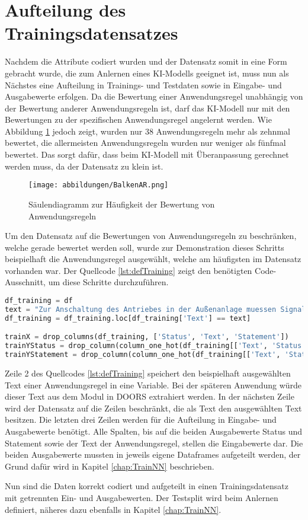 \section{Aufteilung des Trainingsdatensatzes}
\label{chap:Trainingssplit}
Nachdem die Attribute codiert wurden und der Datensatz somit in eine Form gebracht wurde, die zum Anlernen eines \ac{KI}-Modells geeignet ist, 
muss nun als Nächstes eine Aufteilung in Trainings- und Testdaten sowie in Eingabe- und Ausgabewerte erfolgen. Da die Bewertung einer Anwendungsregel
unabhängig von der Bewertung anderer Anwendungsregeln ist, darf das \ac{KI}-Modell nur mit den Bewertungen zu der spezifischen Anwendungsregel angelernt werden.
Wie Abbildung \ref*{fig:ARMenge} jedoch zeigt, wurden nur 38 Anwendungsregeln mehr als zehnmal bewertet, die allermeisten Anwendungsregeln wurden nur weniger als 
fünfmal bewertet. Das sorgt dafür, dass beim \ac{KI}-Modell mit Überanpassung gerechnet werden muss, da der Datensatz zu klein ist.
\begin{figure}[H]
    \centering
    \texttt{[image: abbildungen/BalkenAR.png]}
    \caption{Säulendiagramm zur Häufigkeit der Bewertung von Anwendungsregeln}
    \label{fig:ARMenge}
\end{figure}

Um den Datensatz auf die Bewertungen von Anwendungsregeln zu beschränken, welche gerade bewertet werden soll, wurde zur Demonstration dieses Schritts 
beispielhaft die Anwendungsregel ausgewählt, welche am häufigsten im Datensatz vorhanden war. Der Quellcode \ref*{lst:defTraining} zeigt den benötigten Code-Ausschnitt,
um diese Schritte durchzuführen.

\begin{lstlisting}[language = python, caption={Definieren des Trainingsdatensatzes},captionpos=b, label = lst:defTraining, floatplacement=H]
df_training = df
text = "Zur Anschaltung des Antriebes in der Außenanlage muessen Signalkabel nach VDE 0816/2 oder Kabel mit vergleichbaren Eigenschaften verwendet werden. Die Verlegevorschriften des Kabels sind einzuhalten."
df_training = df_training.loc[df_training['Text'] == text]

trainX = drop_columns(df_training, ['Status', 'Text', 'Statement'])
trainYStatus = drop_column(column_one_hot(df_training[['Text', 'Status']], ['Status']), "Text")
trainYStatement = drop_column(column_one_hot(df_training[['Text', 'Statement']], ['Statement']), "Text")
\end{lstlisting}

Zeile 2 des Quellcodes \ref*{lst:defTraining} speichert den beispielhaft ausgewählten Text einer Anwendungsregel in eine Variable. Bei der späteren Anwendung würde dieser Text
aus dem Modul in \ac{DOORS} extrahiert werden. In der nächsten Zeile wird der Datensatz auf die Zeilen beschränkt, die als Text den ausgewählten Text besitzen.
Die letzten drei Zeilen werden für die Aufteilung in Eingabe- und Ausgabewerte benötigt. Alle Spalten, bis auf die beiden Ausgabewerte \glqq Status\grqq{} und 
\glqq Statement\grqq{} sowie der Text der Anwendungsregel, stellen die Eingabewerte dar. Die beiden Ausgabewerte mussten in jeweils eigene Dataframes aufgeteilt werden, 
der Grund dafür wird in Kapitel \ref*{chap:TrainNN} beschrieben.

Nun sind die Daten korrekt codiert und aufgeteilt in einen Trainingsdatensatz mit getrennten Ein- und Ausgabewerten. Der Testsplit wird beim Anlernen definiert, näheres dazu ebenfalls in 
Kapitel \ref*{chap:TrainNN}.